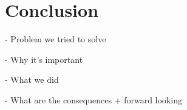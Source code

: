 \chapter{Conclusion}

- Problem we tried to solve

- Why it's important

- What we did

- What are the consequences + forward looking
